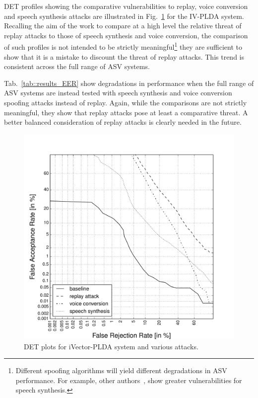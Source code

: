 DET profiles showing the comparative vulnerabilities to replay, voice conversion and speech synthesis attacks are illustrated in Fig.~\ref{fig::DETs_4attacks} for the IV-PLDA system.  Recalling the aim of the work to compare at a high level the relative threat of replay attacks to those of speech synthesis and voice conversion, the comparison of such profiles is not intended to be strictly meaningful\footnote{Different spoofing algorithms will yield different degradations in ASV performance.  For example, other authors~\cite{DeLeon2012,Ergunay2015,Wu2015}, show greater vulnerabilities for speech synthesis.} they are sufficient to show that it is a mistake to discount the threat of replay attacks.  This trend is consistent across the full range of ASV systems.  

Tab.~\ref{tab::results_EER} show degradations in performance when the full range of ASV systems are instead tested with speech synthesis and voice conversion spoofing attacks instead of replay.  Again, while the comparisons are not strictly meaningful, they show that replay attacks pose at least a comparative threat.  A better balanced consideration of replay attacks is clearly needed in the future.

\begin{figure}[!t]
	\centering
	\includegraphics[width=1\linewidth]{Figs/DETs_IV_ss_vc_rp.pdf}
	\caption{DET plots for iVector-PLDA system and various attacks.}
	\label{fig::DETs_4attacks}
\end{figure}




